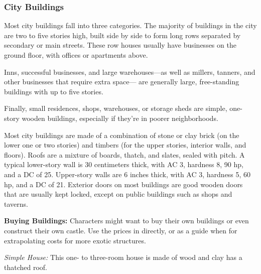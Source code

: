 \subsubsection{City Buildings}
Most city buildings fall into three categories. The majority of buildings in the city are two to five stories high, built side by side to form long rows separated by secondary or main streets. These row houses usually have businesses on the ground floor, with offices or apartments above.

Inns, successful businesses, and large warehouses---as well as millers, tanners, and other businesses that require extra space--- are generally large, free-standing buildings with up to five stories.

Finally, small residences, shops, warehouses, or storage sheds are simple, one-story wooden buildings, especially if they're in poorer neighborhoods.

Most city buildings are made of a combination of stone or clay brick (on the lower one or two stories) and timbers (for the upper stories, interior walls, and floors). Roofs are a mixture of boards, thatch, and slates, sealed with pitch. A typical lower-story wall is 30 centimeters thick, with AC 3, hardness 8, 90 hp, and a  DC of 25. Upper-story walls are 6 inches thick, with AC 3, hardness 5, 60 hp, and a  DC of 21. Exterior doors on most buildings are good wooden doors that are usually kept locked, except on public buildings such as shops and taverns.

\textbf{Buying Buildings:} Characters might want to buy their own buildings or even construct their own castle. Use the prices in  directly, or as a guide when for extrapolating costs for more exotic structures.

\textit{Simple House:} This one- to three-room house is made of wood and clay has a thatched roof.

